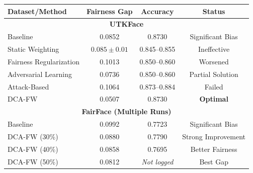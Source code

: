 \documentclass[11pt,a4paper]{report}
\begin{document}
\begin{table}[h]
\centering
\begin{tabular}{|l|c|c|c|}
\hline
\textbf{Dataset/Method} & \textbf{Fairness Gap} & \textbf{Accuracy} & \textbf{Status} \\
\hline
\multicolumn{4}{|c|}{\textbf{UTKFace}} \\
\hline
Baseline & 0.0852 & 0.8730 & Significant Bias \\
Static Weighting & $0.085 \pm 0.01$ & 0.845--0.855 & Ineffective \\
Fairness Regularization & 0.1013 & 0.850--0.860 & Worsened \\
Adversarial Learning & 0.0736 & 0.850--0.860 & Partial Solution \\
Attack-Based & 0.1064 & 0.873--0.884 & Failed \\
DCA-FW & 0.0507 & 0.8730 & \textbf{Optimal} \\
\hline
\multicolumn{4}{|c|}{\textbf{FairFace (Multiple Runs)}} \\
\hline
Baseline & 0.0992 & 0.7723 & Significant Bias \\
DCA-FW (30\%) & 0.0880 & 0.7790 & Strong Improvement \\
DCA-FW (40\%) & 0.0858 & 0.7695 & Better Fairness \\
DCA-FW (50\%) & 0.0812 & \textit{Not logged} & Best Gap \\
\hline
\end{tabular}
\end{table}
\end{document}
